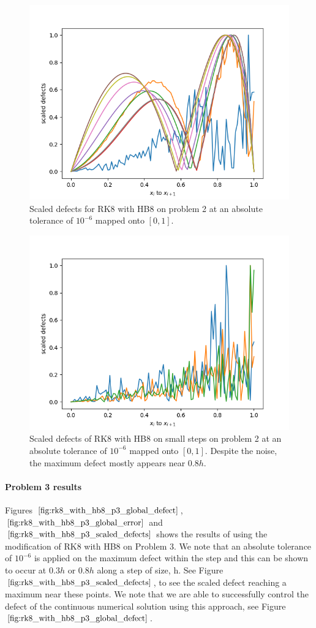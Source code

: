 \begin{figure}[H]
\centering
\includegraphics[width=0.7\linewidth]{./figures/rk8_with_hb8_p2_scaled_defects}
\caption{Scaled defects for RK8 with HB8 on problem 2 at an absolute tolerance of $10^{-6}$  mapped onto $[0, 1]$.}
\label{fig:rk8_with_hb8_p2_scaled_defects}
\end{figure}

\begin{figure}[H]
\centering
\includegraphics[width=0.7\linewidth]{./figures/rk8_with_hb8_p2_scaled_defects_small_steps}
\caption{Scaled defects of RK8 with HB8 on small steps on problem 2 at an absolute tolerance of $10^{-6}$ mapped onto $[0, 1]$. Despite the noise, the maximum defect mostly appears near $0.8h$.}
\label{fig:rk8_with_hb8_p2_scaled_defects_small_steps}
\end{figure}

\paragraph{Problem 3 results}
Figures $\ref{fig:rk8_with_hb8_p3_global_defect}$, $\ref{fig:rk8_with_hb8_p3_global_error}$ and $\ref{fig:rk8_with_hb8_p3_scaled_defects}$ shows the results of using the modification of RK8 with HB8 on Problem 3. 
We note that an absolute tolerance of $10^{-6}$ is applied on the maximum defect within the step and this can be shown to occur at $0.3h$ or $0.8h$ along a step of size, h. See Figure $\ref{fig:rk8_with_hb8_p3_scaled_defects}$, to see the scaled defect reaching a maximum near these points. We note that we are able to successfully control the defect of the continuous numerical solution using this approach, see Figure $\ref{fig:rk8_with_hb8_p3_global_defect}$. 


